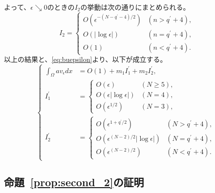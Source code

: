 よって、$\epsilon \searrow 0$のときの$I_2$の挙動は次の通りにまとめられる。
\[
 I_2 = \begin{cases}
        O(\epsilon^{-(N-q^\prime-4)/2}) & (n > q^\prime + 4),\\
        O(\lvert \log \epsilon \rvert) & (n = q^\prime + 4), \\ 
        O(1) & (n < q^\prime + 4).
       \end{cases}
\]
以上の結果と、\eqref{eq:buepsilon}より、以下が成立する。
\begin{equation}
 \left\{ 
 \begin{aligned}
  \int_\Omega a v_\epsilon dx &= O(1) + m_1 I_1^\prime + m_2
  I_2^\prime, \\
  I_1^\prime &= \begin{cases}
                 O(\epsilon) & (N \geq 5), \\
                 O(\epsilon \lvert \log \epsilon \rvert) & (N = 4), \\
                 O(\epsilon^{1/2}) & (N = 3),
                \end{cases} \\
  I_2^\prime &= \begin{cases}
                 O(\epsilon^{1 + q^\prime/2 }) & (N > q^\prime + 4), \\
                 O(\epsilon^{(N-2)/2} \lvert \log \epsilon \rvert) & (N =
                 q^\prime + 4), \\
                 O(\epsilon^{(N-2)/2}) & (N < q^\prime + 4).
                \end{cases}
 \end{aligned} \right.
\end{equation}

\subsection{命題~\ref{prop:second_2}の証明}

